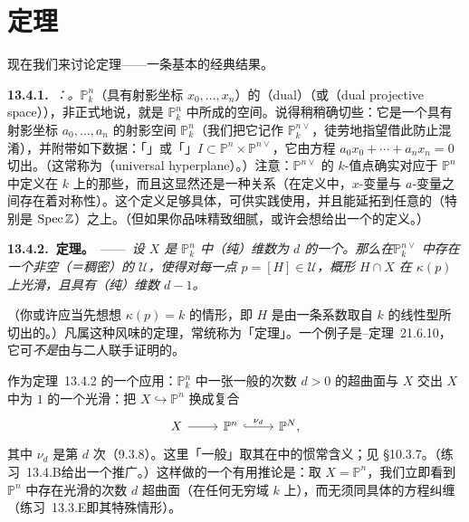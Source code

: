
\section{\trBertini{}定理}

现在我们来讨论\trBertini{}定理——一条基本的经典结果。

\textbf{13.4.1.}\ \emph{\trhDefinition{}：\trDualProjectiveSpace。}\quad $\mathbb{P}^n_k$（具有射影坐标 $x_0,\dots,x_n$）的\textbf{\trDual}（dual）（或\textbf{\trDualProjectiveSpace}（dual projective space）），非正式地说，就是 $\mathbb{P}^n_k$ 中\trHyperplane{}所成的空间。说得稍稍确切些：它是一个具有射影坐标 $a_0,\dots,a_n$ 的射影空间 $\mathbb{P}^n_k$（我们把它记作 $\mathbb{P}^{n\vee}_k$，徒劳地指望借此防止混淆），并附带如下数据：「\trIncidenceVariety」或「\trIncidenceCorrespondence」$I\subset\mathbb{P}^n\times\mathbb{P}^{n\vee}$，它由方程 $a_0x_0+\cdots+a_nx_n=0$ 切出。（这常称为\textbf{\trUniversalHyperplane}（universal hyperplane）。）注意：$\mathbb{P}^{n\vee}$ 的 $k$-值点确实对应于 $\mathbb{P}^n$ 中定义在 $k$ 上的那些\trHyperplane，而且这显然还是一种\trDuality{}关系（在定义中，$x$-变量与 $a$-变量之间存在着对称性）。这个定义足够具体，可供实践使用，并且能延拓到任意的\trBase（特别是 $\operatorname{Spec}\mathbb{Z}$）之上。（但如果你品味精致细腻，或许会想给出一个\trCoordinateFree{}的定义。）

\textbf{13.4.2.\ \trBertini{}定理。}\ ——\ \emph{设 $X$ 是 $\mathbb{P}^n_k$ 中（纯）维数为 $d$ 的一个\trSmooth\trClosed\trSubvariety。那么在\trDualProjectiveSpace $\mathbb{P}^{n\vee}_k$ 中存在一个非空（＝稠密）的\trOpenSubset{} $\mathcal{U}$，使得对每一点 $p=[H]\in\mathcal{U}$，概形 $H\cap X$ 在 $\kappa(p)$ 上光滑，且具有（纯）维数 $d-1$。}

（你或许应当先想想 $\kappa(p)=k$ 的情形，即 $H$ 是由一条系数取自 $k$ 的线性型所切出的\trHyperplane。）凡属这种风味的定理，常统称为「\trBertini{}定理」。一个例子是\trKleiman{}--\trBertini{}定理~21.6.10，它可\emph{不是}由\trKleiman{}与\trBertini{}二人联手证明的。

作为\trBertini{}定理~13.4.2 的一个应用：$\mathbb{P}^n_k$ 中一张一般的次数 $d>0$ 的超曲面与 $X$ 交出 $X$ 中\trCodimension{}为 $1$ 的一个光滑\trSubvariety：把 $X\hookrightarrow\mathbb{P}^n$ 换成复合
\[
\begin{tikzcd}
X \ar[r] & \mathbb{P}^n \ar[r, hook, "\nu_d"] & \mathbb{P}^N,
\end{tikzcd}
\]
其中 $\nu_d$ 是第 $d$ 次\trVeroneseEmbedding{}（9.3.8）。这里「一般」取其在\trAlgebraicGeometry{}中的惯常含义；见 \S10.3.7。（\mbox{练习~13.4.B}给出一个推广。）这样做的一个有用推论是：取 $X=\mathbb{P}^n$，我们立即看到 $\mathbb{P}^n$ 中存在光滑的次数 $d$ 超曲面（在任何无穷域 $k$ 上），而无须同具体的方程纠缠（\mbox{练习~13.3.E}即其特殊情形）。

